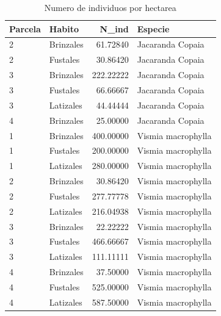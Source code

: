 \documentclass[letterpaper,9pt,twocolumn,twoside,]{pinp}
\begin{document}
\begin{table}

\caption{\label{tab:unnamed-chunk-11}Numero de individuos por hectarea}
\centering
\begin{tabular}[t]{l|l|r|l}
\hline
Parcela & Habito & N\_ind & Especie\\
\hline
2 & Brinzales & 61.72840 & Jacaranda Copaia\\
\hline
2 & Fustales & 30.86420 & Jacaranda Copaia\\
\hline
3 & Brinzales & 222.22222 & Jacaranda Copaia\\
\hline
3 & Fustales & 66.66667 & Jacaranda Copaia\\
\hline
3 & Latizales & 44.44444 & Jacaranda Copaia\\
\hline
4 & Brinzales & 25.00000 & Jacaranda Copaia\\
\hline
1 & Brinzales & 400.00000 & Vismia macrophylla\\
\hline
1 & Fustales & 200.00000 & Vismia macrophylla\\
\hline
1 & Latizales & 280.00000 & Vismia macrophylla\\
\hline
2 & Brinzales & 30.86420 & Vismia macrophylla\\
\hline
2 & Fustales & 277.77778 & Vismia macrophylla\\
\hline
2 & Latizales & 216.04938 & Vismia macrophylla\\
\hline
3 & Brinzales & 22.22222 & Vismia macrophylla\\
\hline
3 & Fustales & 466.66667 & Vismia macrophylla\\
\hline
3 & Latizales & 111.11111 & Vismia macrophylla\\
\hline
4 & Brinzales & 37.50000 & Vismia macrophylla\\
\hline
4 & Fustales & 525.00000 & Vismia macrophylla\\
\hline
4 & Latizales & 587.50000 & Vismia macrophylla\\
\hline
\end{tabular}
\end{table}





\end{document}

